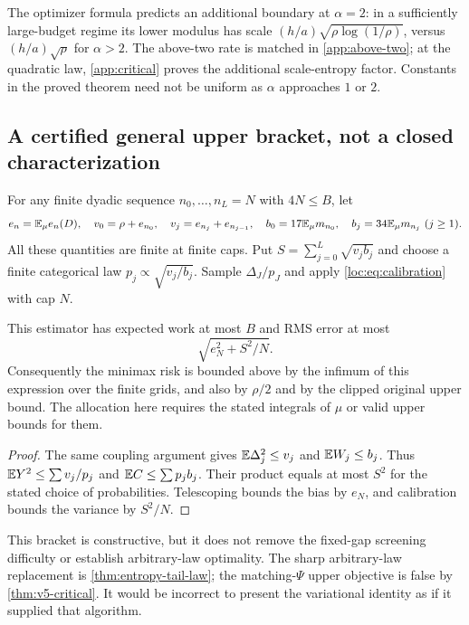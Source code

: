 The optimizer formula predicts an additional boundary at $\alpha=2$: in a sufficiently large-budget regime its lower modulus has scale $(h/a)\sqrt{\rho\log(1/\rho)}$, versus $(h/a)\sqrt\rho$ for $\alpha>2$. The above-two rate is matched in \cref{app:above-two}; at the quadratic
law, \cref{app:critical} proves the additional scale-entropy factor. Constants in the proved theorem need not be uniform as $\alpha$ approaches $1$ or $2$.

\subsection{A certified general upper bracket, not a closed characterization}
For any finite dyadic sequence $n_0,\ldots,n_L=N$ with $4N\le B$, let
\[
 e_n=\mathbb E_\mu e_n(D),\quad
 v_0=\rho+e_{n_0},\quad v_j=e_{n_j}+e_{n_{j-1}},\quad
 b_0=17\mathbb E_\mu m_{n_0},\quad b_j=34\mathbb E_\mu m_{n_j}\ (j\ge1).
\]
All these quantities are finite at finite caps. Put
$S=\sum_{j=0}^L\sqrt{v_jb_j}$ and choose a finite categorical law
$p_j\propto\sqrt{v_j/b_j}$. Sample $\Delta_J/p_J$ and apply \eqref{loc:eq:calibration} with cap $N$.
\begin{proposition}\label{loc:prop:generalupper}
This estimator has expected work at most $B$ and RMS error at most
\[
 \sqrt{e_N^2+S^2/N}.
\]
Consequently the minimax risk is bounded above by the infimum of this expression over the finite grids, and also by $\rho/2$ and by the clipped original upper bound. The allocation here requires the stated integrals of $\mu$ or valid upper bounds for them.
\end{proposition}
\begin{proof}
The same coupling argument gives $\mathbb E\Delta_j^2\le v_j$ and $\mathbb E W_j\le b_j$. Thus
$\mathbb E Y^2\le\sum v_j/p_j$ and $\mathbb E C\le\sum p_jb_j$. Their product equals at most $S^2$ for the stated choice of probabilities. Telescoping bounds the bias by $e_N$, and calibration bounds the variance by $S^2/N$.
\end{proof}

This bracket is constructive, but it does not remove the fixed-gap screening difficulty or establish arbitrary-law optimality. The sharp arbitrary-law replacement is \cref{thm:entropy-tail-law};
the matching-$\Psi$ upper objective is false by \cref{thm:v5-critical}. It would be incorrect to present the variational identity as if it supplied that algorithm.
